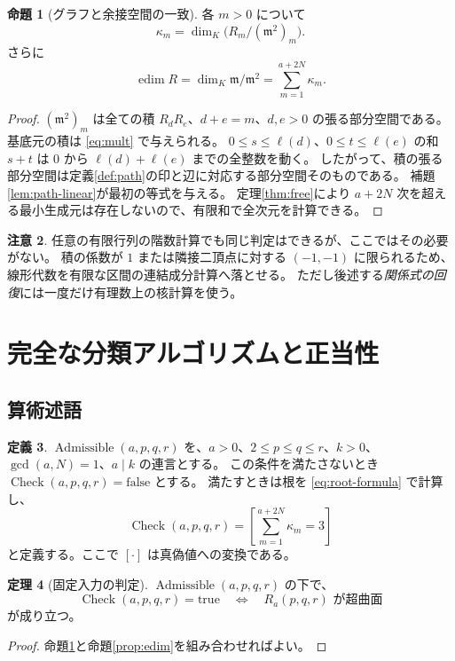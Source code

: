 \documentclass[11pt,a4paper]{ltjsarticle}
\numberwithin{equation}{section}
\theoremstyle{definition}
\newtheorem{theorem}{定理}[section]
\newtheorem{proposition}[theorem]{命題}
\newtheorem{definition}[theorem]{定義}
\newtheorem{remark}[theorem]{注意}
\newcommand{\mf}{\mathfrak m}\newcommand{\NF}{\operatorname{NF}}\newcommand{\Frac}{\operatorname{Frac}}\newcommand{\trdeg}{\operatorname{trdeg}}\newcommand{\edim}{\operatorname{edim}}\newcommand{\lcm}{\operatorname{lcm}}\newcommand{\Span}{\operatorname{span}}\newcommand{\Classify}{\operatorname{Classify}}\newcommand{\CheckR}{\operatorname{Check}}\newcommand{\Admissible}{\operatorname{Admissible}}\newcommand{\ord}{\operatorname{ord}}
\begin{document}
\begin{proposition}[グラフと余接空間の一致]\label{prop:kappa}
各 $m>0$ について
\[
 \kappa_m=\dim_K\bigl(R_m/(\mf^2)_m\bigr).
\]
さらに
\begin{equation}\label{eq:edim-sum}
 \edim R=\dim_K\mf/\mf^2=\sum_{m=1}^{a+2N}\kappa_m.
\end{equation}
\end{proposition}
\begin{proof}
$(\mf^2)_m$ は全ての積 $R_dR_e$、$d+e=m$、$d,e>0$ の張る部分空間である。
基底元の積は \eqref{eq:mult} で与えられる。
$0\le s\le\ell(d)$、$0\le t\le\ell(e)$ の和 $s+t$ は $0$ から $\ell(d)+\ell(e)$ までの全整数を動く。
したがって、積の張る部分空間は定義\ref{def:path}の印と辺に対応する部分空間そのものである。
補題\ref{lem:path-linear}が最初の等式を与える。
定理\ref{thm:free}により $a+2N$ 次を超える最小生成元は存在しないので、有限和で全次元を計算できる。
\end{proof}
\begin{remark}
任意の有限行列の階数計算でも同じ判定はできるが、ここではその必要がない。
積の係数が $1$ または隣接二頂点に対する $(-1,-1)$ に限られるため、線形代数を有限な区間の連結成分計算へ落とせる。
ただし後述する\emph{関係式の回復}には一度だけ有理数上の核計算を使う。
\end{remark}

\section{完全な分類アルゴリズムと正当性}\label{sec:algorithm}
\subsection{算術述語}
\begin{definition}\label{def:check}
$\Admissible(a,p,q,r)$ を、$a>0$、$2\le p\le q\le r$、$k>0$、$\gcd(a,N)=1$、$a\mid k$ の連言とする。
この条件を満たさないとき $\CheckR(a,p,q,r)=\mathrm{false}$ とする。
満たすときは根を \eqref{eq:root-formula} で計算し、
\[
 \CheckR(a,p,q,r)=
 \left[\sum_{m=1}^{a+2N}\kappa_m=3\right]
\]
と定義する。ここで $[\cdot]$ は真偽値への変換である。
\end{definition}

\begin{theorem}[固定入力の判定]\label{thm:check}
$\Admissible(a,p,q,r)$ の下で、
\[
 \CheckR(a,p,q,r)=\mathrm{true}\quad\Longleftrightarrow\quad R_a(p,q,r)\text{ が超曲面}
\]
が成り立つ。
\end{theorem}
\begin{proof}
命題\ref{prop:kappa}と命題\ref{prop:edim}を組み合わせればよい。
\end{proof}
\end{document}
